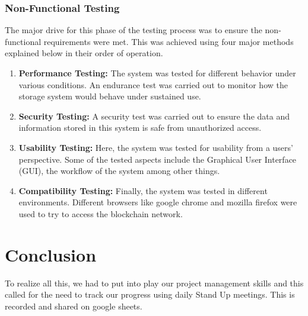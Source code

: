 \subsubsection{Non-Functional Testing}
The major drive for this phase of the testing process was to ensure the non-functional requirements were met. This was achieved using four major methods explained below in their order of operation.
\begin{enumerate}
\item \textbf{Performance Testing:} The system was tested for different behavior under various conditions. An endurance test was carried out to monitor how the storage system would behave under sustained use.
\item \textbf{Security Testing:} A security test was carried out to ensure the data and information stored in this system is safe from unauthorized access.
\item \textbf{Usability Testing:} Here, the system was tested for usability from a users' perspective. Some of the tested aspects include the Graphical User Interface (GUI), the workflow of the system among other things.
\item \textbf{Compatibility Testing:} Finally, the system was tested in different environments. Different browsers like google chrome and mozilla firefox were used to try to access the blockchain network.
\end{enumerate}

\section{Conclusion}
To realize all this, we had to put into play our project management skills and this called for the need to track our progress using daily Stand Up meetings. This is recorded and shared on google sheets\cite{art12}.


